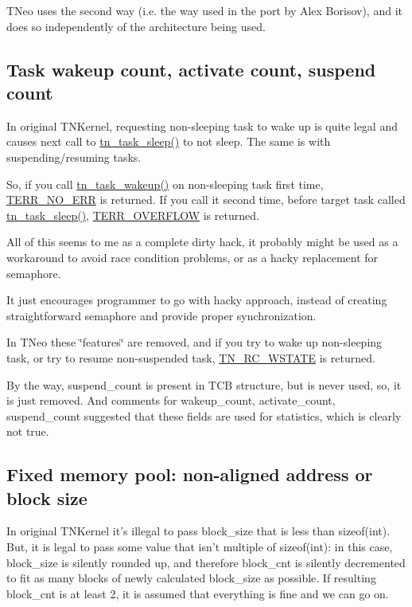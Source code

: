 T\+Neo uses the second way (i.\+e. the way used in the port by Alex Borisov), and it does so independently of the architecture being used.\hypertarget{tnkernel_diff_tnkernel_diff_wakeup_count}{}\subsection{Task wakeup count, activate count, suspend count}\label{tnkernel_diff_tnkernel_diff_wakeup_count}
In original T\+N\+Kernel, requesting non-\/sleeping task to wake up is quite legal and causes next call to {\ttfamily \hyperlink{tn__tasks_8h_ae768a72ca0efde5767796cc1770bd45e}{tn\+\_\+task\+\_\+sleep()}} to not sleep. The same is with suspending/resuming tasks.

So, if you call {\ttfamily \hyperlink{tn__tasks_8h_abb88bc8b1cec6b82e7b6e2e90d0e155a}{tn\+\_\+task\+\_\+wakeup()}} on non-\/sleeping task first time, {\ttfamily \hyperlink{tn__oldsymbols_8h_a71970f860643e62fad7ec03076bdc1d8}{T\+E\+R\+R\+\_\+\+N\+O\+\_\+\+E\+R\+R}} is returned. If you call it second time, before target task called {\ttfamily \hyperlink{tn__tasks_8h_ae768a72ca0efde5767796cc1770bd45e}{tn\+\_\+task\+\_\+sleep()}}, {\ttfamily \hyperlink{tn__oldsymbols_8h_abfe40d04917509ecd3a98c38878df5ff}{T\+E\+R\+R\+\_\+\+O\+V\+E\+R\+F\+L\+O\+W}} is returned.

All of this seems to me as a complete dirty hack, it probably might be used as a workaround to avoid race condition problems, or as a hacky replacement for semaphore.

It just encourages programmer to go with hacky approach, instead of creating straightforward semaphore and provide proper synchronization.

In T\+Neo these \char`\"{}features\char`\"{} are removed, and if you try to wake up non-\/sleeping task, or try to resume non-\/suspended task, {\ttfamily \hyperlink{tn__common_8h_aa43bd3da1ad4c1e61224b5f23b369876a7b6d93374f52ba4b2fc01b38b783aa4c}{T\+N\+\_\+\+R\+C\+\_\+\+W\+S\+T\+A\+T\+E}} is returned.

By the way, {\ttfamily suspend\+\_\+count} is present in {\ttfamily T\+C\+B} structure, but is never used, so, it is just removed. And comments for {\ttfamily wakeup\+\_\+count}, {\ttfamily activate\+\_\+count}, {\ttfamily suspend\+\_\+count} suggested that these fields are used for statistics, which is clearly not true.\hypertarget{tnkernel_diff_tnkernel_diff_fmem}{}\subsection{Fixed memory pool\+: non-\/aligned address or block size}\label{tnkernel_diff_tnkernel_diff_fmem}
In original T\+N\+Kernel it's illegal to pass {\ttfamily block\+\_\+size} that is less than {\ttfamily sizeof(int)}. But, it is legal to pass some value that isn't multiple of {\ttfamily sizeof(int)}\+: in this case, {\ttfamily block\+\_\+size} is silently rounded up, and therefore {\ttfamily block\+\_\+cnt} is silently decremented to fit as many blocks of newly calculated {\ttfamily block\+\_\+size} as possible. If resulting {\ttfamily block\+\_\+cnt} is at least 2, it is assumed that everything is fine and we can go on.


